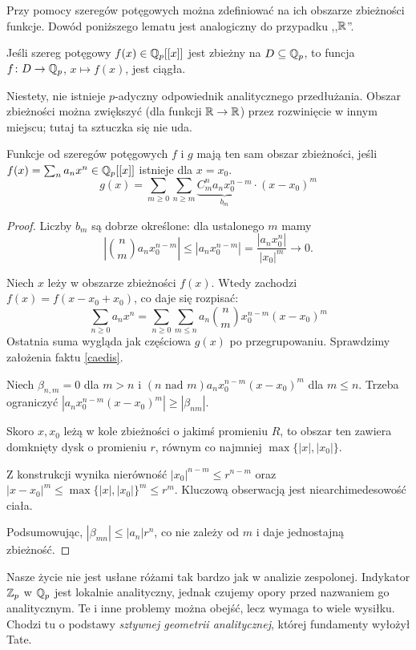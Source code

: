 
Przy pomocy szeregów potęgowych można zdefiniować na ich obszarze zbieżności funkcje.
Dowód poniższego lematu jest analogiczny do przypadku ,,$\mathbb R$''.

\begin{lemat}
	Jeśli szereg potęgowy $f(x) \in \mathbb Q_p[[x]]$ jest zbieżny na $D \subseteq \mathbb Q_p$, to funcja $f \colon D \to \mathbb Q_p$, $x \mapsto f(x)$, jest ciągła.
\end{lemat}

Niestety, nie istnieje $p$-adyczny odpowiednik analitycznego przedłużania.
Obszar zbieżności można zwiększyć (dla funkcji $\mathbb R \to \mathbb R$) przez rozwinięcie w innym miejscu; tutaj ta sztuczka się nie uda.

\begin{fakt}
	Funkcje od szeregów potęgowych $f$ i $g$ mają ten sam obszar zbieżności, jeśli $f(x) = \sum_n a_n x^n \in \mathbb Q_p[[x]]$ istnieje dla $x = x_0$.
	\[
		g(x) = \sum_{m \ge 0} \sum_{n \ge m} \underbrace{ C^n_m a_n x_0^{n-m}}_{b_m}\cdot (x-x_0)^m 
	\]
\end{fakt}

\begin{proof}
	Liczby $b_m$ są dobrze określone: dla ustalonego $m$ mamy
	\[
		\left|{n \choose m} a_n x_0^{n-m}\right| \le |a_n x_0^{n-m}| = \frac{|a_nx_0^n|}{|x_0|^m} \to 0.
	\]

	Niech $x$ leży w obszarze zbieżności $f(x)$.
	Wtedy zachodzi $f(x) = f(x - x_0 + x_0)$, co daje się rozpisać:
	\[
		\sum_{n \ge 0} a_n x^n = \sum_{n \ge 0} \sum_{m \le n} a_n  {n \choose m} x_0^{n-m} (x-x_0)^m
	\]
	Ostatnia suma wygląda jak częściowa $g(x)$ po przegrupowaniu.
	Sprawdzimy założenia faktu \ref{caedis}.

	Niech $\beta_{n, m} = 0$ dla $m > n$ i $(n \textrm{ nad } m )a_n x_0^{n-m}(x - x_0)^m$ dla $m \le n$.
	Trzeba ograniczyć $|a_n x_0^{n-m} (x - x_0)^m| \ge |\beta_{nm}|$.

	Skoro $x, x_0$ leżą w kole zbieżności o jakimś promieniu $R$, to obszar ten zawiera domknięty dysk o promieniu $r$, równym co najmniej $\max \{|x|, |x_0|\}$.

	Z konstrukcji wynika nierówność $|x_0|^{n-m} \le r^{n-m}$ oraz $|x - x_0|^m \le \max \{|x|, |x_0|\}^m \le r^m$.
	Kluczową obserwacją jest niearchimedesowość ciała.

	Podsumowując, $|\beta_{mn}| \le |a_n| r^n$, co nie zależy od $m$ i daje jednostajną zbieżność.
\end{proof}

Nasze życie nie jest usłane różami tak bardzo jak w analizie zespolonej.
Indykator $\mathbb Z_p$ w $\mathbb Q_p$ jest lokalnie analityczny, jednak czujemy opory przed nazwaniem go analitycznym.
Te i inne problemy można obejść, lecz wymaga to wiele wysiłku.
Chodzi tu o podstawy \emph{sztywnej geometrii analitycznej}, której fundamenty wyłożył Tate.

